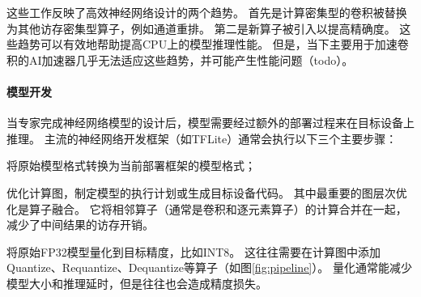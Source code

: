 这些工作反映了高效神经网络设计的两个趋势。
首先是计算密集型的卷积被替换为其他访存密集型算子，例如通道重排。
第二是新算子被引入以提高精确度。
这些趋势可以有效地帮助提高CPU上的模型推理性能。
但是，当下主要用于加速卷积的AI加速器几乎无法适应这些趋势，并可能产生性能问题（todo）。

\paragraph{模型开发}
当专家完成神经网络模型的设计后，模型需要经过额外的部署过程来在目标设备上推理。
主流的神经网络开发框架（如TFLite）通常会执行以下三个主要步骤：
\begin{enumerate*}
    \item 将原始模型格式转换为当前部署框架的模型格式；
    \item 优化计算图，制定模型的执行计划或生成目标设备代码。
    其中最重要的图层次优化是算子融合。
    它将相邻算子（通常是卷积和逐元素算子）的计算合并在一起，减少了中间结果的访存开销。
    \item 将原始FP32模型量化到目标精度，比如INT8。
    这往往需要在计算图中添加Quantize、Requantize、Dequantize等算子（如图\ref{fig:pipeline}）。
    量化通常能减少模型大小和推理延时，但是往往也会造成精度损失。
\end{enumerate*}
